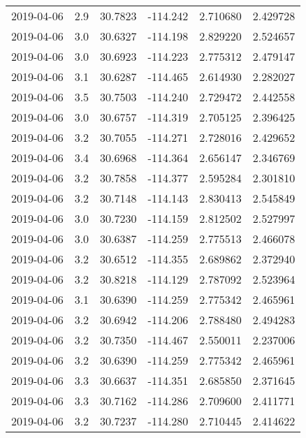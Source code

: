 \begin{tabular}{lrrrrr}
2019-04-06 &       2.9 &  30.7823 &  -114.242 &         2.710680 &         2.429728 \\
2019-04-06 &       3.0 &  30.6327 &  -114.198 &         2.829220 &         2.524657 \\
2019-04-06 &       3.0 &  30.6923 &  -114.223 &         2.775312 &         2.479147 \\
2019-04-06 &       3.1 &  30.6287 &  -114.465 &         2.614930 &         2.282027 \\
2019-04-06 &       3.5 &  30.7503 &  -114.240 &         2.729472 &         2.442558 \\
2019-04-06 &       3.0 &  30.6757 &  -114.319 &         2.705125 &         2.396425 \\
2019-04-06 &       3.2 &  30.7055 &  -114.271 &         2.728016 &         2.429652 \\
2019-04-06 &       3.4 &  30.6968 &  -114.364 &         2.656147 &         2.346769 \\
2019-04-06 &       3.2 &  30.7858 &  -114.377 &         2.595284 &         2.301810 \\
2019-04-06 &       3.2 &  30.7148 &  -114.143 &         2.830413 &         2.545849 \\
2019-04-06 &       3.0 &  30.7230 &  -114.159 &         2.812502 &         2.527997 \\
2019-04-06 &       3.0 &  30.6387 &  -114.259 &         2.775513 &         2.466078 \\
2019-04-06 &       3.2 &  30.6512 &  -114.355 &         2.689862 &         2.372940 \\
2019-04-06 &       3.2 &  30.8218 &  -114.129 &         2.787092 &         2.523964 \\
2019-04-06 &       3.1 &  30.6390 &  -114.259 &         2.775342 &         2.465961 \\
2019-04-06 &       3.2 &  30.6942 &  -114.206 &         2.788480 &         2.494283 \\
2019-04-06 &       3.2 &  30.7350 &  -114.467 &         2.550011 &         2.237006 \\
2019-04-06 &       3.2 &  30.6390 &  -114.259 &         2.775342 &         2.465961 \\
2019-04-06 &       3.3 &  30.6637 &  -114.351 &         2.685850 &         2.371645 \\
2019-04-06 &       3.3 &  30.7162 &  -114.286 &         2.709600 &         2.411771 \\
2019-04-06 &       3.2 &  30.7237 &  -114.280 &         2.710445 &         2.414622 \\

\end{tabular}
